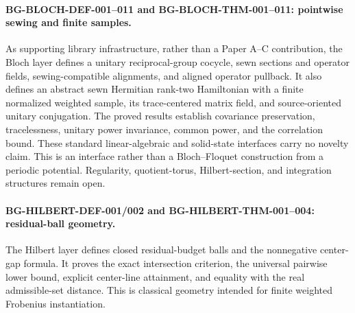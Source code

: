 \documentclass[11pt]{article}
\begin{document}
\paragraph{BG-BLOCH-DEF-001--011 and BG-BLOCH-THM-001--011: pointwise sewing and finite samples.}
As supporting library infrastructure, rather than a Paper A--C contribution, the Bloch
layer defines a unitary reciprocal-group cocycle, sewn sections and operator fields,
sewing-compatible alignments, and aligned operator pullback. It also defines an abstract
sewn Hermitian rank-two Hamiltonian with a finite normalized weighted sample, its
trace-centered matrix field, and source-oriented unitary conjugation. The proved results
establish covariance preservation, tracelessness, unitary power invariance, common
power, and the correlation bound. These standard linear-algebraic and solid-state
interfaces carry no novelty claim. This is an interface rather than a Bloch--Floquet
construction from a periodic potential. Regularity, quotient-torus,
Hilbert-section, and integration structures remain open.

\paragraph{BG-HILBERT-DEF-001/002 and BG-HILBERT-THM-001--004: residual-ball geometry.}
The Hilbert layer defines closed residual-budget balls and the nonnegative center-gap
formula. It proves the exact intersection criterion, the universal pairwise lower bound,
explicit center-line attainment, and equality with the real admissible-set distance.
This is classical geometry intended for finite weighted Frobenius instantiation.
\end{document}

